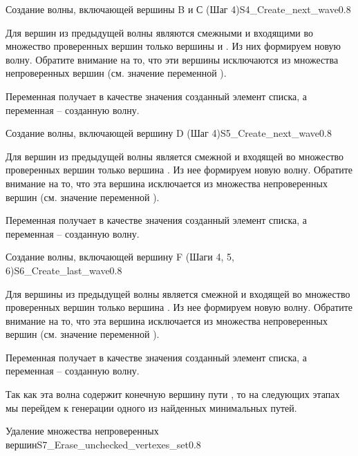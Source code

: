 \begin{itemize}
\begin{algostep}{Создание волны, включающей вершины B и С (Шаг
    4)}{S4_Create_next_wave}{0.8}
  
  Для вершин из предыдущей волны являются смежными и входящими во
  множество проверенных вершин только вершины  и . Из них
  формируем новую волну. Обратите внимание на то, что эти вершины
  исключаются из множества непроверенных вершин (см. значение
  переменной ).

  Переменная  получает в качестве значения
  созданный элемент списка, а переменная  – созданную
  волну.
\end{algostep}


\begin{algostep}{Создание волны, включающей вершину D (Шаг
    4)}{S5_Create_next_wave}{0.8}

  Для вершин из предыдущей волны является смежной и входящей во
  множество проверенных вершин только вершина . Из нее формируем
  новую волну. Обратите внимание на то, что эта вершина исключается из
  множества непроверенных вершин (см. значение переменной
  ).

  Переменная  получает в качестве значения
  созданный элемент списка, а переменная  – созданную
  волну.
\end{algostep}


\begin{algostep}{Создание волны, включающей вершину F (Шаги 4, 5,
    6)}{S6_Create_last_wave}{0.8}

  Для вершины из предыдущей волны является смежной и входящей во
  множество проверенных вершин только вершина . Из нее формируем
  новую волну. Обратите внимание на то, что эта вершина исключается из
  множества непроверенных вершин (см. значение переменной
  ).

  Переменная  получает в качестве значения
  созданный элемент списка, а переменная  – созданную
  волну.

  Так как эта волна содержит конечную вершину пути , то на
  следующих этапах мы перейдем к генерации одного из найденных
  минимальных путей.
\end{algostep}


\begin{algostep}{Удаление множества непроверенных
    вершин}{S7_Erase_unchecked_vertexes_set}{0.8}
 

\end{algostep}
\end{itemize}
